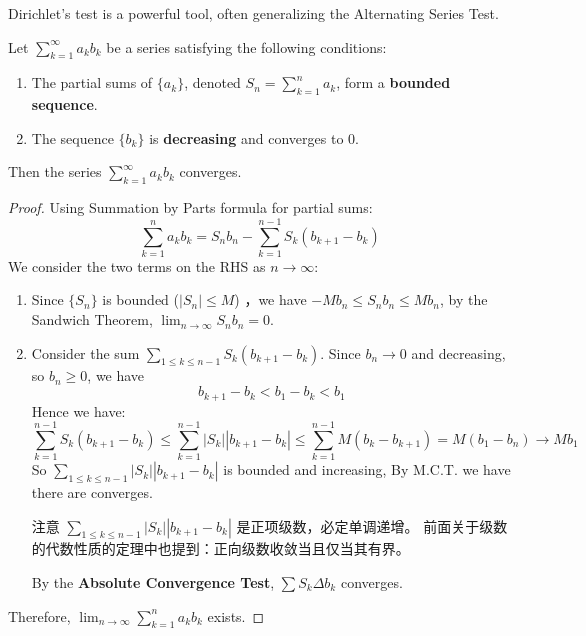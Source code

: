 \documentclass[
	UTF-8,
	11pt, %
	a4paper, %
]{LegrandOrangeBook}
\begin{document}
    Dirichlet's test is a powerful tool, often generalizing the Alternating Series Test.

    \begin{theorem}
    Let $\sum_{k=1}^\infty a_k b_k$ be a series satisfying the following conditions:
    \begin{enumerate}
        \item The partial sums of $\{a_k\}$, denoted $S_n = \sum_{k=1}^n a_k$, form a \textbf{bounded sequence}. 
        \item The sequence $\{b_k\}$ is \textbf{decreasing} and 
        converges to 0.
    \end{enumerate}
    Then the series $\sum_{k=1}^\infty a_k b_k$ converges.
    \end{theorem}

    \begin{proof}
    Using Summation by Parts formula for partial sums:
    \[ \sum_{k=1}^n a_k b_k = S_n b_n - \sum_{k=1}^{n-1} S_k (b_{k+1} - b_k) \]
    We consider the two terms on the RHS as $n \to \infty$:
    \begin{enumerate}
        \item Since $\{S_n\}$ is bounded ($|S_n| \le M$) ，we have $-Mb_n \leq S_n b_n \leq M b_n$, 
        by the Sandwich Theorem, $\lim_{n \to \infty} S_n b_n = 0$.
        \item Consider the sum $\displaystyle\sum_{1 \leq k \leq n-1} S_k(b_{k+1}-b_k)$. Since $b_n \to 0$ and decreasing, 
        so $b_n \geq 0$, we have
        \[
        b_{k+1} - b_k < b_1 - b_k < b_1
        \]
        Hence we have: 
        \[
        \sum_{k=1}^{n-1} S_k (b_{k+1} - b_k) \leq \sum_{k=1}^{n-1} |S_k| |b_{k+1} - b_k|
        \leq \sum_{k=1}^{n-1} M (b_k - b_{k+1}) = M (b_1 - b_n ) \to M b_1 
        \]
        So $\displaystyle\sum_{1\leq k \leq n-1} |S_k| |b_{k+1} - b_k|$ is bounded and increasing, By M.C.T. 
        we have there are converges.
        \begin{remark}
            注意 $\displaystyle\sum_{1\leq k \leq n-1} |S_k| |b_{k+1} - b_k|$ 是正项级数，必定单调递增。
            前面关于级数的代数性质的定理中也提到：正向级数收敛当且仅当其有界。
        \end{remark}
        By the \textbf{Absolute Convergence Test}, $\sum S_k \Delta b_k$ converges.
    \end{enumerate}
    Therefore, $\lim_{n \to \infty} \sum_{k=1}^n a_k b_k$ exists.
    \end{proof}
\end{document}
